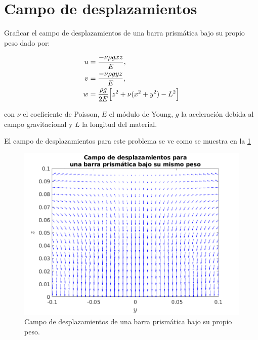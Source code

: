 \documentclass[./../main.tex]{subfiles}
\begin{document}

    \section{Campo de desplazamientos}

    Graficar el campo de desplazamientos de una barra prismática bajo su propio peso dado por:

    \begin{align*}
        u &= \dfrac{-\nu\rho gxz}{E},\\
        v &= \dfrac{-\nu\rho gyz}{E},\\
        w &= \dfrac{\rho g}{2E}\Bigl[z^{2} + \nu(x^{2} + y^{2}) - L^{2}\Bigr]
    \end{align*}

    con \(\nu\) el coeficiente de Poisson, \(E\) el módulo de Young, \(g\) la aceleración debida al campo gravitacional y \(L\) la longitud del material.

    El campo de desplazamientos para este problema se ve como se muestra en la \cref{fig:displacement-field}

    \begin{figure}[htb]
        \centering
        \includegraphics[scale=0.75]{campodesplazamientos}
        \caption{Campo de desplazamientos de una barra prismática bajo su propio peso.}
        \label{fig:displacement-field}
    \end{figure}
\end{document}

